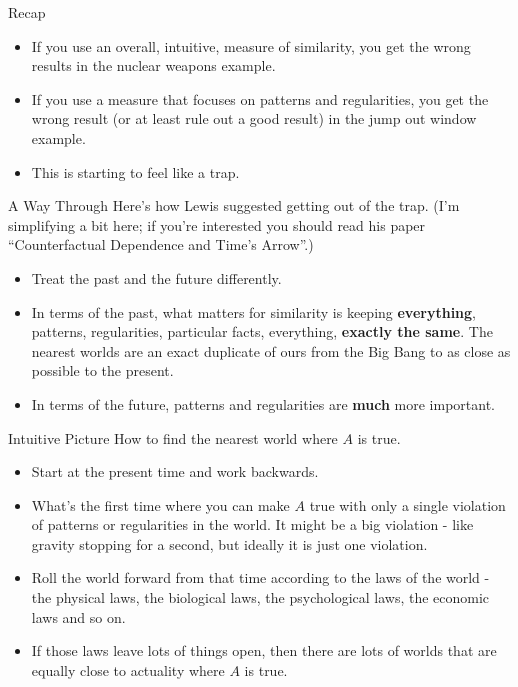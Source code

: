 \documentclass[
  ignorenonframetext,
]{beamer}
\providecommand{\tightlist}{%
  \setlength{\itemsep}{0pt}\setlength{\parskip}{0pt}}
\renewcommand{\,}{\text{, }}
\begin{document}
\begin{frame}{Recap}
\protect\hypertarget{recap}{}
\begin{itemize}
\tightlist
\item
  If you use an overall, intuitive, measure of similarity, you get the
  wrong results in the nuclear weapons example.
\item
  If you use a measure that focuses on patterns and regularities, you
  get the wrong result (or at least rule out a good result) in the jump
  out window example.
\item
  This is starting to feel like a trap.
\end{itemize}
\end{frame}

\begin{frame}{A Way Through}
\protect\hypertarget{a-way-through}{}
Here's how Lewis suggested getting out of the trap. (I'm simplifying a
bit here; if you're interested you should read his paper
``Counterfactual Dependence and Time's Arrow''.)

\begin{itemize}
\tightlist
\item
  Treat the past and the future differently.
\item
  In terms of the past, what matters for similarity is keeping
  \textbf{everything}, patterns, regularities, particular facts,
  everything, \textbf{exactly the same}. The nearest worlds are an exact
  duplicate of ours from the Big Bang to as close as possible to the
  present.
\item
  In terms of the future, patterns and regularities are \textbf{much}
  more important.
\end{itemize}
\end{frame}

\begin{frame}{Intuitive Picture}
\protect\hypertarget{intuitive-picture}{}
How to find the nearest world where \(A\) is true.

\begin{itemize}
\tightlist
\item
  Start at the present time and work backwards.
\item
  What's the first time where you can make \(A\) true with only a single
  violation of patterns or regularities in the world. It might be a big
  violation - like gravity stopping for a second, but ideally it is just
  one violation.
\item
  Roll the world forward from that time according to the laws of the
  world - the physical laws, the biological laws, the psychological
  laws, the economic laws and so on.
\item
  If those laws leave lots of things open, then there are lots of worlds
  that are equally close to actuality where \(A\) is true.
\end{itemize}
\end{frame}
\end{document}
